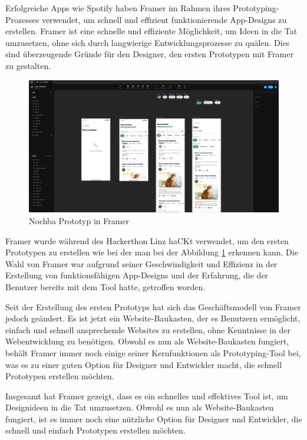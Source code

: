 Erfolgreiche Apps wie Spotify haben Framer im Rahmen ihres
Prototyping-Prozesses verwendet, um schnell und effizient
funktionierende App-Designs zu erstellen. Framer ist eine
schnelle und effiziente Möglichkeit, um Ideen in die Tat
umzusetzen, ohne sich durch langwierige Entwicklungsprozesse
zu quälen. Dies sind überzeugende Gründe für den Designer, den ersten Prototypen mit Framer zu gestalten.

\begin{figure}[h]
  \centering
  \includegraphics[width=1\textwidth]{pics/nochba-framer-prototype-screenshot.png}
  \caption{Nochba Prototyp in Framer}
  \label{fig:framer-prototype}
\end{figure}


Framer wurde während des Hackerthon Linz haCKt verwendet, um
den ersten Prototypen zu erstellen wie bei der man bei der
Abbildung \ref{fig:framer-prototype} erkennen kann. Die Wahl von Framer war
aufgrund seiner Geschwindigkeit und Effizienz in der
Erstellung von funktionsfähigen App-Designs und der
Erfahrung, die der Benutzer bereits mit dem Tool hatte,
getroffen worden.

Seit der Erstellung des ersten Prototyps hat sich das Geschäftsmodell von Framer jedoch geändert. Es ist jetzt ein Website-Baukasten, der es Benutzern ermöglicht, einfach und schnell ansprechende Websites zu erstellen, ohne Kenntnisse in der Webentwicklung zu benötigen. Obwohl es nun als Website-Baukasten fungiert, behält Framer immer noch einige seiner Kernfunktionen als Prototyping-Tool bei, was es zu einer guten Option für Designer und Entwickler macht, die schnell Prototypen erstellen möchten.

Insgesamt hat Framer gezeigt, dass es ein schnelles und effektives Tool ist, um Designideen in die Tat umzusetzen. Obwohl es nun als Website-Baukasten fungiert, ist es immer noch eine nützliche Option für Designer und Entwickler, die schnell und einfach Prototypen erstellen möchten.

